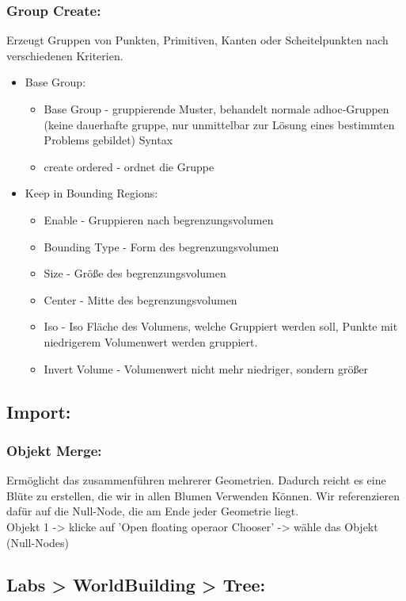 \documentclass[paper=a4,fontsize=12pt,ngerman]{scrartcl}
\begin{document}
	\subsubsection*{Group Create:}
	Erzeugt Gruppen von Punkten, Primitiven, Kanten oder Scheitelpunkten nach verschiedenen Kriterien.
	\begin{itemize}
		\item Base Group:	
		\begin{itemize}
			\item Base Group - gruppierende Muster, behandelt normale adhoc-Gruppen (keine dauerhafte gruppe, nur unmittelbar zur Lösung eines bestimmten Problems gebildet) Syntax
			\item create ordered - ordnet die Gruppe
		\end{itemize}
		\item Keep in Bounding Regions:
		\begin{itemize}
			\item Enable	- Gruppieren nach begrenzungsvolumen
			\item Bounding Type - Form des begrenzungsvolumen
			\item Size - Größe des begrenzungsvolumen
			\item Center - Mitte des begrenzungsvolumen
			\item Iso - Iso Fläche des Volumens, welche Gruppiert werden soll, Punkte mit niedrigerem Volumenwert werden gruppiert. 
			\item Invert Volume - Volumenwert nicht mehr niedriger, sondern größer
		\end{itemize}
	\end{itemize}

	\subsection*{Import:}
	\subsubsection*{Objekt Merge:}
	Ermöglicht das zusammenführen mehrerer Geometrien. Dadurch reicht es eine Blüte zu erstellen, die wir in allen Blumen Verwenden Können. Wir referenzieren dafür auf die Null-Node, die am Ende jeder Geometrie liegt.\\
	Objekt 1 -> klicke auf 'Open floating operaor Chooser' -> wähle das Objekt (Null-Nodes)
	
	\subsection*{Labs > WorldBuilding > Tree:}
\end{document}
